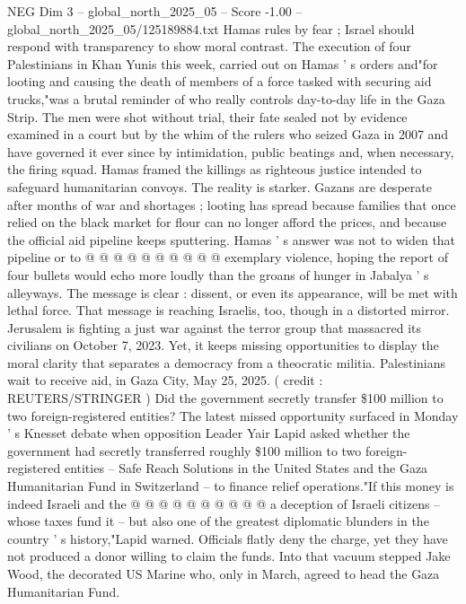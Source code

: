 \begin{textsample}{NEG Dim 3 – global\_north\_2025\_05 – Score -1.00 – global\_north\_2025\_05/125189884.txt}  \label{ex:f3_neg_321}
Hamas rules by fear ; Israel should respond with transparency to show moral contrast.
The execution of four Palestinians in Khan Yunis this week, carried out on Hamas ' s orders and"for looting and causing the death of members of a force tasked with securing aid trucks,"was a brutal reminder of who really controls day-to-day life in the Gaza Strip.
The men were shot without trial, their fate sealed not by evidence examined in a court but by the whim of the rulers who seized Gaza in 2007 and have governed it ever since by intimidation, public beatings and, when necessary, the firing squad.
Hamas framed the killings as righteous justice intended to safeguard humanitarian convoys.
The reality is starker.
Gazans are desperate after months of war and shortages ; looting has spread because families that once relied on the black market for flour can no longer afford the prices, and because the official aid pipeline keeps sputtering.
Hamas ' s answer was not to widen that pipeline or to @ @ @ @ @ @ @ @ @ @ exemplary violence, hoping the report of four bullets would echo more loudly than the groans of hunger in Jabalya ' s alleyways.
The message is clear : dissent, or even its appearance, will be met with lethal force.
That message is reaching Israelis, too, though in a distorted mirror.
Jerusalem is fighting a just war against the terror group that massacred its civilians on October 7, 2023.
Yet, it keeps missing opportunities to display the moral clarity that separates a democracy from a theocratic militia.
Palestinians wait to receive aid, in Gaza City, May 25, 2025. ( credit : REUTERS/STRINGER ) Did the government secretly transfer \$100 million to two foreign-registered entities?
The latest missed opportunity surfaced in Monday ' s Knesset debate when opposition Leader Yair Lapid asked whether the government had secretly transferred roughly \$100 million to two foreign-registered entities -- Safe Reach Solutions in the United States and the Gaza Humanitarian Fund in Switzerland -- to finance relief operations."If this money is indeed Israeli and the @ @ @ @ @ @ @ @ @ @ a deception of Israeli citizens -- whose taxes fund it -- but also one of the greatest diplomatic blunders in the country ' s history,"Lapid warned.
Officials flatly deny the charge, yet they have not produced a donor willing to claim the funds.
Into that vacuum stepped Jake Wood, the decorated US Marine who, only in March, agreed to head the Gaza Humanitarian Fund.

\end{textsample}
